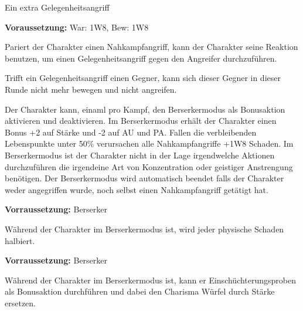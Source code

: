 \documentclass[../../Heldenanleitung2]{subfiles}
\begin{document}
\begin{multicols}{2}
\begin{tcolorbox}[title={Kampfreflexe},colbacktitle=red, coltitle=black]
   Ein extra Gelegenheitsangriff
\end{tcolorbox}

\begin{tcolorbox}[title={Gegenangriff},colbacktitle=red, coltitle=black]
	\textbf{Voraussetzung:} War: 1W8, Bew: 1W8
	\vspace{0.2cm}
		
   Pariert der Charakter einen Nahkampfangriff, kann der Charakter seine Reaktion benutzen, um einen Gelegenheitsangriff gegen den Angreifer durchzuführen.
\end{tcolorbox}

\begin{tcolorbox}[title={Stellung halten},colbacktitle=red, coltitle=black]    
   Trifft ein Gelegenheitsangriff einen Gegner, kann sich dieser Gegner in dieser Runde nicht mehr bewegen und nicht angreifen.
\end{tcolorbox}


\begin{tcolorbox}[title={Berserker},colbacktitle=red, coltitle=black]    
   Der Charakter kann, einaml pro Kampf, den Berserkermodus als Bonusaktion aktivieren und deaktivieren. Im Berserkermodus erhält der Charakter einen Bonus +2 auf Stärke und -2 auf AU und PA. Fallen die verbleibenden Lebenspunkte unter 50\% verursachen alle Nahkampfangriffe +1W8 Schaden. Im Berserkermodus ist der Charakter nicht in der Lage irgendwelche Aktionen durchzuführen die irgendeine Art von Konzentration oder geistiger Anstrengung benötigen. Der Berserkermodus wird automatisch beendet falls der Charakter weder angegriffen wurde, noch selbst einen Nahkampfangriff getätigt hat.
\end{tcolorbox}

\begin{tcolorbox}[title={Berserkerkraft, Zäh},colbacktitle=red, coltitle=black]    
    \textbf{Vorraussetzung:} Berserker
	\vspace{0.2cm}	
	
   Während der Charakter im Berserkermodus ist, wird jeder physische Schaden halbiert.
\end{tcolorbox}

\begin{tcolorbox}[title={Berserkerkraft, Furchteinflößend},colbacktitle=red, coltitle=black]    
    \textbf{Vorraussetzung:} Berserker
	\vspace{0.2cm}	
	
    Während der Charakter im Berserkermodus ist, kann er Einschüchterungsproben als Bonusaktion durchführen und dabei den Charisma Würfel durch Stärke ersetzen.
\end{tcolorbox}


\end{multicols}
\end{document}
